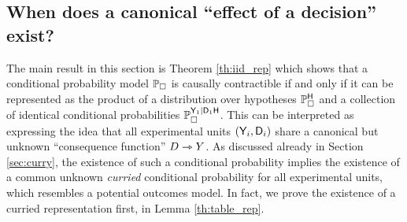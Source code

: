 






\subsection{When does a canonical ``effect of a decision'' exist?}

The main result in this section is Theorem \ref{th:iid_rep} which shows that a conditional probability model $\mathbb{P}_\square$ is causally contractible if and only if it can be represented as the product of a distribution over hypotheses $\mathbb{P}_\square^{\mathsf{H}}$ and a collection of identical conditional probabilities $\mathbb{P}_\square^{\mathsf{Y}_1|\mathsf{D}_1\mathsf{H}}$. This can be interpreted as expressing the idea that all experimental units $(\mathsf{Y}_i,\mathsf{D}_i)$ share a canonical but unknown ``consequence function'' $D\rightarrowtriangle Y$. As discussed already in Section \ref{sec:curry}, the existence of such a conditional probability implies the existence of a common unknown \emph{curried} conditional probability for all experimental units, which resembles a potential outcomes model. In fact, we prove the existence of a curried representation first, in Lemma \ref{th:table_rep}.

